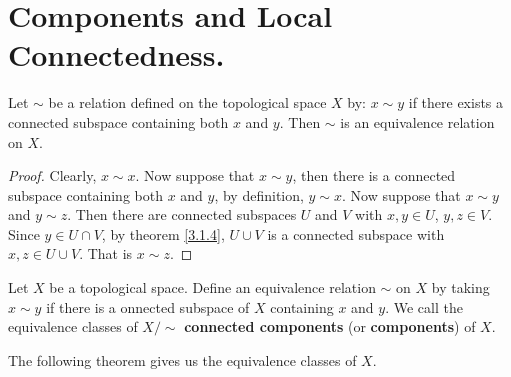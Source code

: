 
\section{Components and Local Connectedness.}

\begin{proposition}\label{3.3.1}
    Let $\sim$ be a relation defined on the topological space  $X$ by:  $x \sim y$ if there exists a
    connected subspace containing both  $x$ and  $y$. Then $\sim$ is an equivalence relation on
    $X$.
\end{proposition}
\begin{proof}
    Clearly, $x \sim x$. Now suppose that  $x \sim y$, then there is a connected subspace containing
    both  $x$ and  $y$, by definition,  $y \sim x$. Now suppose that  $x \sim y$ and  $y \sim z$.
    Then there are connected subspaces  $U$ and  $V$ with  $x,y \in U$,  $y,z \in V$. Since $y \in U
    \cap V$, by theorem \ref{3.1.4}, $U \cup V$ is a connected subspace with  $x,z \in U \cup V$.
    That is  $x \sim z$. 
\end{proof}

\begin{definition}
    Let $X$ be a topological space. Define an equivalence relation  $\sim$ on  $X$ by taking  $x
    \sim y$ if there is a onnected subspace of  $X$ containing  $x$ and  $y$. We call the
    equivalence classes of  $X/\sim$  \textbf{connected components} (or \textbf{components}) of
    $X$.
\end{definition}

The following theorem gives us the equivalence classes of $X$.

